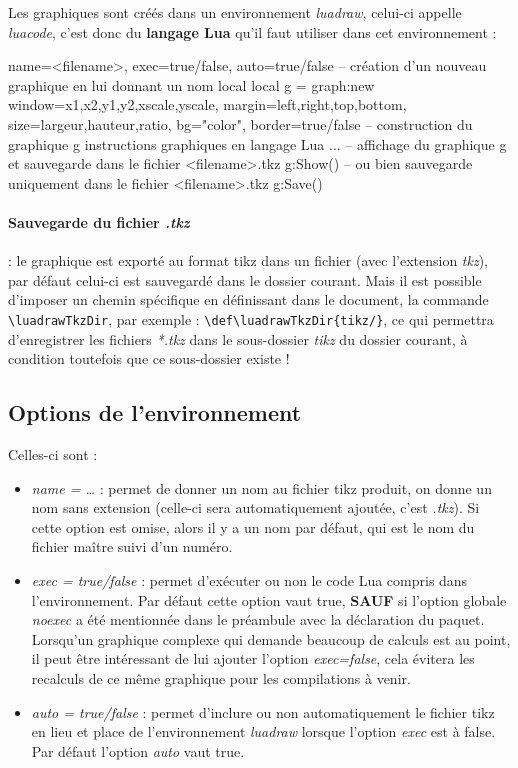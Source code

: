 \documentclass[%
10pt,%
a4paper,%
french,%
]%
{article}%
\def\luadrawTkzDir{tkz/}%
\begin{document}
Les graphiques sont créés dans un environnement \emph{luadraw}, celui-ci appelle \emph{luacode}, c'est donc du \textbf{langage Lua} qu'il faut utiliser dans cet environnement :

\begin{TeXcode}
\begin{luadraw}{ name=<filename>, exec=true/false, auto=true/false }
-- création d'un nouveau graphique en lui donnant un nom local
local g = graph:new{ window={x1,x2,y1,y2,xscale,yscale}, margin={left,right,top,bottom},
                     size={largeur,hauteur,ratio}, bg="color", border=true/false }
-- construction du graphique g
    instructions graphiques en langage Lua ...
-- affichage du graphique g et sauvegarde dans le fichier <filename>.tkz
g:Show()
-- ou bien sauvegarde uniquement dans le fichier <filename>.tkz
g:Save()
\end{luadraw}
\end{TeXcode}

\paragraph{Sauvegarde du fichier \emph{.tkz}} : le graphique est exporté au format tikz dans un fichier (avec l'extension \emph{tkz}), par défaut celui-ci est sauvegardé dans le dossier courant. Mais il est possible d'imposer un chemin spécifique en définissant dans le document, la commande \verb|\luadrawTkzDir|, par exemple : \verb|\def\luadrawTkzDir{tikz/}|, ce qui permettra d'enregistrer les fichiers \emph{*.tkz} dans le sous-dossier \emph{tikz} du dossier courant, à condition toutefois que ce sous-dossier existe !

\subsection{Options de l'environnement}

Celles-ci sont :
\begin{itemize}
\item \emph{name = \ldots{}} : permet de donner un nom au fichier tikz produit, on donne un nom sans extension (celle-ci sera automatiquement ajoutée, c'est \emph{.tkz}). Si cette option est omise, alors il y a un nom par défaut, qui est le nom du fichier maître suivi d'un numéro.
\item \emph{exec = true/false} : permet d'exécuter ou non le code Lua compris dans l'environnement. Par défaut cette option vaut true, \textbf{SAUF} si l'option globale \emph{noexec} a été mentionnée dans le préambule avec la déclaration du paquet. Lorsqu'un graphique complexe qui demande beaucoup de calculs est au point, il peut être intéressant de lui ajouter l'option \emph{exec=false}, cela évitera les recalculs de ce même graphique pour les compilations à venir.
\item \emph{auto = true/false} : permet d'inclure ou non automatiquement le fichier tikz en lieu et place de l'environnement \emph{luadraw} lorsque l'option \emph{exec} est à false. Par défaut l'option \emph{auto} vaut true.
\end{itemize}
\end{document}
